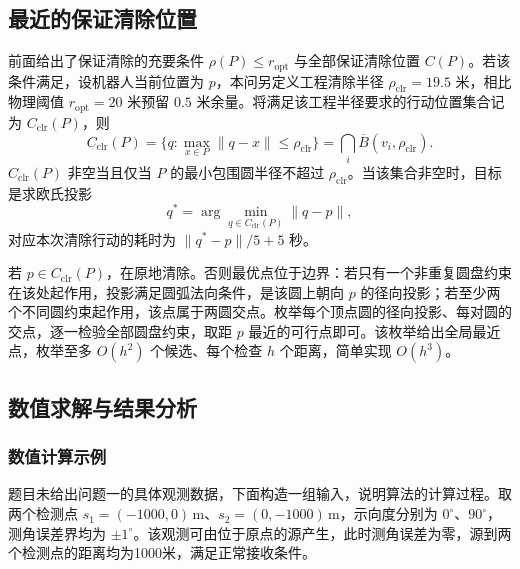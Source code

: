 \documentclass[UTF8,a4paper,zihao=-4,fontset=none]{ctexart}
\begin{document}
\subsection{最近的保证清除位置}

前面给出了保证清除的充要条件 \(\rho(P)\le r_{\mathrm{opt}}\) 与全部保证清除位置 \(C(P)\)。若该条件满足，设机器人当前位置为 \(p\)，本问另定义工程清除半径 \(\rho_{\mathrm{clr}}=19.5\) 米，相比物理阈值 \(r_{\mathrm{opt}}=20\) 米预留 \(0.5\) 米余量。将满足该工程半径要求的行动位置集合记为 \(C_{\mathrm{clr}}(P)\)，则
\begin{equation}
  C_{\mathrm{clr}}(P)=\{q:\max_{x\in P}\lVert q-x\rVert\le\rho_{\mathrm{clr}}\}
  =\bigcap_{i}\overline{B}(v_i,\rho_{\mathrm{clr}}).
  \label{eq:clear-proj}
\end{equation}
\(C_{\mathrm{clr}}(P)\) 非空当且仅当 \(P\) 的最小包围圆半径不超过 \(\rho_{\mathrm{clr}}\)。当该集合非空时，目标是求欧氏投影
\begin{equation}
  q^*=\arg\min_{q\in C_{\mathrm{clr}}(P)}\lVert q-p\rVert ,
\end{equation}
对应本次清除行动的耗时为 \(\lVert q^*-p\rVert/5+5\) 秒。

若 \(p\in C_{\mathrm{clr}}(P)\)，在原地清除。否则最优点位于边界：若只有一个非重复圆盘约束在该处起作用，投影满足圆弧法向条件，是该圆上朝向 \(p\) 的径向投影；若至少两个不同圆约束起作用，该点属于两圆交点。枚举每个顶点圆的径向投影、每对圆的交点，逐一检验全部圆盘约束，取距 \(p\) 最近的可行点即可。该枚举给出全局最近点，枚举至多 \(O(h^2)\) 个候选、每个检查 \(h\) 个距离，简单实现 \(O(h^3)\)。

\subsection{数值求解与结果分析}

\subsubsection{数值计算示例}

题目未给出问题一的具体观测数据，下面构造一组输入，说明算法的计算过程。取两个检测点 \(s_1=(-1000,0)\,\mathrm{m}\)、\(s_2=(0,-1000)\,\mathrm{m}\)，示向度分别为 \(0^\circ\)、\(90^\circ\)，测角误差界均为 \(\pm1^\circ\)。该观测可由位于原点的源产生，此时测角误差为零，源到两个检测点的距离均为1000米，满足正常接收条件。
\end{document}
